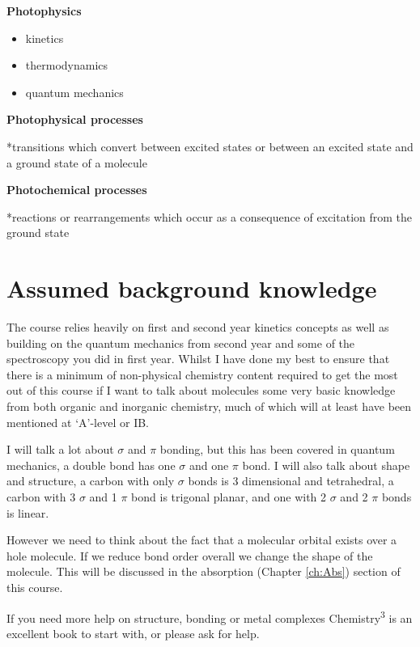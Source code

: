 \documentclass[
]{book}
\providecommand{\tightlist}{%
  \setlength{\itemsep}{0pt}\setlength{\parskip}{0pt}}
\begin{document}
\textbf{Photophysics}

\begin{itemize}
\tightlist
\item
  kinetics
\item
  thermodynamics
\item
  quantum mechanics
\end{itemize}

\textbf{Photophysical processes}

*transitions which convert between excited states or between an excited state and a ground state of a molecule

\textbf{Photochemical processes}

*reactions or rearrangements which occur as a consequence of excitation from the ground state

\hypertarget{assumed-background-knowledge}{%
\section{Assumed background knowledge}\label{assumed-background-knowledge}}

The course relies heavily on first and second year kinetics concepts as well as building on the quantum mechanics from second year and some of the spectroscopy you did in first year. Whilst I have done my best to ensure that there is a minimum of non-physical chemistry content required to get the most out of this course if I want to talk about molecules some very basic knowledge from both organic and inorganic chemistry, much of which will at least have been mentioned at `A'-level or IB.

I will talk a lot about \(\sigma\) and \(\pi\) bonding, but this has been covered in quantum mechanics, a double bond has one \(\sigma\) and one \(\pi\) bond. I will also talk about shape and structure, a carbon with only \(\sigma\) bonds is 3 dimensional and tetrahedral, a carbon with 3 \(\sigma\) and 1 \(\pi\) bond is trigonal planar, and one with 2 \(\sigma\) and 2 \(\pi\) bonds is linear.

However we need to think about the fact that a molecular orbital exists over a hole molecule. If we reduce bond order overall we change the shape of the molecule. This will be discussed in the absorption (Chapter \ref{ch:Abs}) section of this course.

If you need more help on structure, bonding or metal complexes Chemistry\textsuperscript{3} is an excellent book to start with, or please ask for help.
\end{document}
